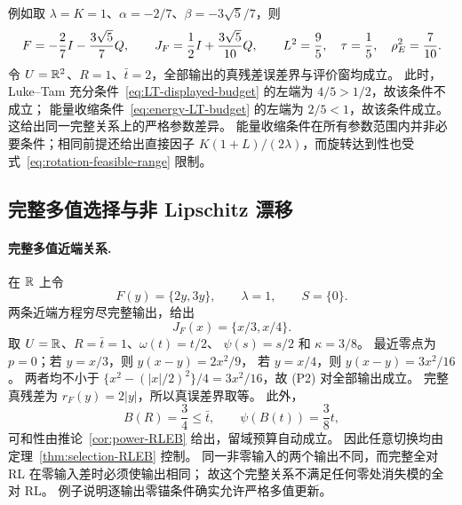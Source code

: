 例如取 $\lambda=K=1$、$\alpha=-2/7$、$\beta=-3\sqrt5/7$，则
\[
 F=-\frac27I-\frac{3\sqrt5}{7}Q,\qquad
 J_F=\frac12I+\frac{3\sqrt5}{10}Q,
 \qquad L^2=\frac95,\quad \tau=\frac15,\quad\rho_E^2=\frac7{10}.
\]
令 $U=\mathbb R^2$、$R=1$、$\bar t=2$，全部输出的真残差误差界与评价窗均成立。
此时，Luke--Tam 充分条件~\eqref{eq:LT-displayed-budget}
的左端为 $4/5>1/2$，故该条件不成立；
能量收缩条件~\eqref{eq:energy-LT-budget}
的左端为 $2/5<1$，故该条件成立。
这给出同一完整关系上的严格参数差异。
能量收缩条件在所有参数范围内并非必要条件；相同前提还给出直接因子
$K(1+L)/(2\lambda)$，而旋转达到性也受式~\eqref{eq:rotation-feasible-range} 限制。

\subsection{完整多值选择与非 Lipschitz 漂移}

\paragraph{完整多值近端关系.}
\label{ex:complete-multivalued}
在 $\mathbb R$ 上令
\[
 F(y)=\{2y,3y\},\qquad \lambda=1,\qquad S=\{0\}.
\]
两条近端方程穷尽完整输出，给出
\[
 J_F(x)=\{x/3,x/4\}.
\]
取 $U=\mathbb R$、$R=\bar t=1$、$\omega(t)=t/2$、
$\psi(s)=s/2$ 和 $\kappa=3/8$。
最近零点为 $p=0$；若 $y=x/3$，则 $y(x-y)=2x^2/9$，
若 $y=x/4$，则 $y(x-y)=3x^2/16$。
两者均不小于 $\{x^2-(|x|/2)^2\}/4=3x^2/16$，故 (P2) 对全部输出成立。
完整真残差为 $r_F(y)=2|y|$，所以真误差界取等。
此外，
\[
 B(R)=\frac34\le\bar t,\qquad
 \psi(B(t))=\frac38t,
\]
可和性由推论~\ref{cor:power-RLEB} 给出，留域预算自动成立。
因此任意切换均由定理~\ref{thm:selection-RLEB} 控制。
同一非零输入的两个输出不同，而完整全对 RL 在零输入差时必须使输出相同；
故这个完整关系不满足任何零处消失模的全对 RL。
例子说明逐输出零锚条件确实允许严格多值更新。

